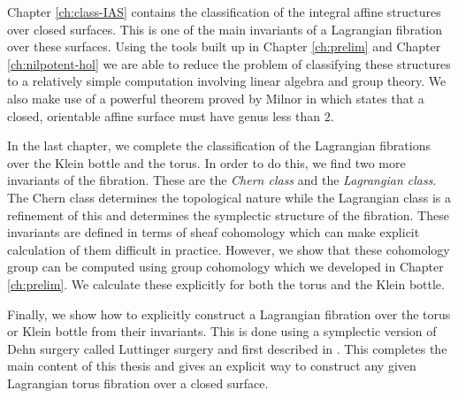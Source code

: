 Chapter \ref{ch:class-IAS} contains the classification of the integral affine
structures over closed surfaces. This is one of the main invariants of a
Lagrangian fibration over these surfaces. Using the tools built up in Chapter
\ref{ch:prelim} and Chapter \ref{ch:nilpotent-hol} we are able to reduce the
problem of classifying these structures to a relatively simple computation
involving linear algebra and group theory. We also make use of a powerful
theorem proved by Milnor in \cite{Milnor1957/58} which states that a closed,
orientable affine surface must have genus less than $2$.

In the last chapter, we complete the classification of the Lagrangian
fibrations over the Klein bottle and the torus. In order to do this, we find
two more invariants of the fibration. These are the \emph{Chern class} and the
\emph{Lagrangian class}. The Chern class determines the topological nature
while the Lagrangian class is a refinement of this and determines the
symplectic structure of the fibration. These invariants are defined in terms of
sheaf cohomology which can make explicit calculation of them difficult in
practice. However, we show that these cohomology group can be computed using
group cohomology which we developed in Chapter \ref{ch:prelim}. We calculate
these explicitly for both the torus and the Klein bottle.

Finally, we show how to explicitly construct a Lagrangian fibration over the
torus or Klein bottle from their invariants. This is done using a symplectic
version of Dehn surgery called Luttinger surgery and first described in
\cite{LuttingerSurgery}. This completes the main content of this thesis and
gives an explicit way to construct any given Lagrangian torus fibration over a
closed surface.